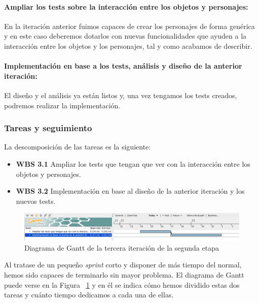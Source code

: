\paragraph{Ampliar los tests sobre la interacción entre los objetos y personajes:} En la iteración anterior fuimos capaces de crear los personajes de forma genérica y en este caso deberemos dotarlos con nuevas funcionalidades que ayuden a la interacción entre los objetos y los personajes, tal y como acabamos de describir.

\paragraph{Implementación en base a los tests, análisis y diseño de la anterior iteración:} El diseño y el análisis ya están listos y, una vez tengamos los tests creados, podremos realizar la implementación.

\subsubsection{Tareas y seguimiento}

La descomposición de las tareas es la siguiente:

\begin{itemize}
  \item \textbf{WBS 3.1} Ampliar los tests que tengan que ver con la interacción entre los objetos y personajes.
  \item \textbf{WBS 3.2} Implementación en base al diseño de la anterior iteración y los nuevos tests.
\end{itemize}

\begin{figure}
    \includegraphics[width=\textwidth,height=\textheight,keepaspectratio]{./img/sec2it3.png}
  \caption{Diagrama de Gantt de la tercera iteración de la segunda etapa}
  \label{fig:sec2it3}
\end{figure}

\noindent Al tratase de un pequeño \textit{sprint} corto y disponer de más tiempo del normal, hemos sido capaces de terminarlo sin mayor problema. El diagrama de Gantt puede verse en la Figura ~\ref{fig:sec2it3} y en él se indica cómo hemos dividido estas dos tareas y cuánto tiempo dedicamos a cada una de ellas.


